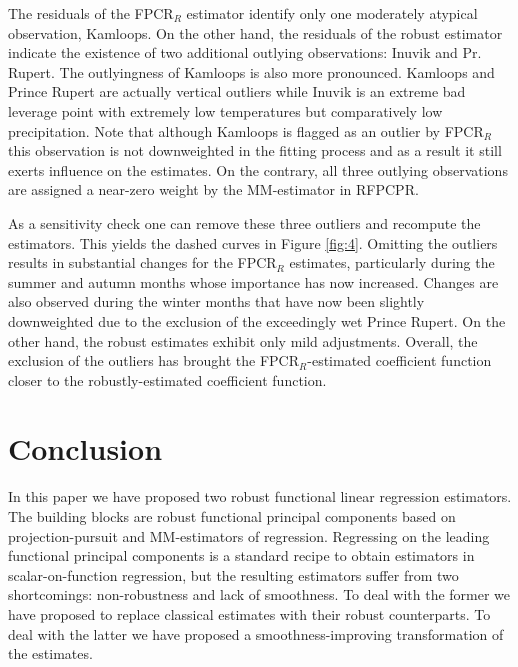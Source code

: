 \documentclass[11pt]{article}
\begin{document}
The residuals of the FPCR$_R$ estimator identify only one moderately atypical observation, Kamloops. On the other hand, the residuals of the robust estimator indicate the existence of two additional outlying observations: Inuvik and Pr. Rupert. The outlyingness of Kamloops is also more pronounced. Kamloops and Prince Rupert are actually vertical outliers while Inuvik is an extreme bad leverage point with extremely low temperatures but comparatively low precipitation. Note that although Kamloops is flagged as an outlier by FPCR$_R$ this observation is not downweighted in the fitting process and as a result it still exerts influence on the estimates.  On the contrary, all three outlying observations are assigned a near-zero weight by the MM-estimator in RFPCPR.

As a sensitivity check one can remove these three outliers and recompute the estimators. This yields the dashed curves in Figure \ref{fig:4}. Omitting the outliers results in substantial changes for the FPCR$_R$ estimates, particularly during the summer and autumn months whose importance has now increased. Changes are also observed during the winter months that have now been slightly downweighted due to the exclusion of the exceedingly wet Prince Rupert. On the other hand, the robust estimates exhibit only mild adjustments. Overall, the exclusion of the outliers has brought the FPCR$_R$-estimated coefficient function closer to the robustly-estimated coefficient function.

\section{Conclusion}

In this paper we have proposed two robust functional linear regression estimators. The building blocks are robust functional principal components based on projection-pursuit and MM-estimators of regression. Regressing on the leading functional principal components is a standard recipe to obtain estimators in scalar-on-function regression, but the resulting estimators suffer from two shortcomings: non-robustness and lack of smoothness. To deal with the former we have proposed to replace classical estimates with their robust counterparts. To deal with the latter we have proposed a smoothness-improving transformation of the estimates.
\end{document}
